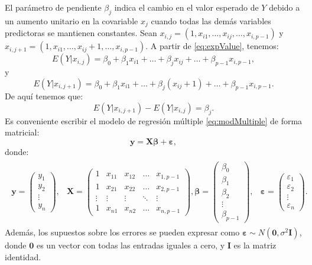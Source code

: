 \documentclass[
]{article}
\begin{document}
El parámetro de pendiente \(\beta_{j}\) indica el cambio en el valor esperado de \(Y\) debido a un aumento unitario en la covariable \(x_{j}\) cuando todas las demás variables predictoras se mantienen constantes. Sean \(x_{i,j} = (1,x_{i1},\ldots,x_{ij},\ldots,x_{i,p-1})\) y \(x_{i,j+1} = (1,x_{i1},\ldots,x_{ij}+1,\ldots,x_{i,p-1})\). A partir de \eqref{eq:expValue}, tenemos:
\[
E(Y|x_{i,j}) = \beta_{0} + \beta_{1}x_{i1} + \ldots + \beta_{j}x_{ij} + \ldots + \beta_{p-1} x_{i,p-1},
\]
y
\[
E(Y|x_{i,j+1}) = \beta_{0} + \beta_{1}x_{i1} + \ldots + \beta_{j}(x_{ij}+1) + \ldots + \beta_{p-1} x_{i,p-1}.
\]
De aquí tenemos que:
\[
E(Y|x_{i,j+1}) - E(Y|x_{i,j}) = \beta_{j}.
\]
Es conveniente escribir el modelo de regresión múltiple \eqref{eq:modMultiple} de forma matricial:
\[
\boldsymbol y= \boldsymbol X\boldsymbol \beta+ \boldsymbol \varepsilon,
\]
donde:
\begin{gather}
\begin{aligned}
\boldsymbol y= \begin{pmatrix}
y_{1} \\ y_{2} \\ \vdots \\ y_{n}
\end{pmatrix}, & \boldsymbol X= \begin{pmatrix}
1 & x_{11} & x_{12} & \ldots & x_{1,p-1} \\ 1 & x_{21} & x_{22} & \ldots & x_{2,p-1} \\ \vdots & \vdots & \vdots & \ddots & \vdots \\ 1 & x_{n1} & x_{n2} & \ldots & x_{n,p-1}
\end{pmatrix},
\boldsymbol \beta= \begin{pmatrix}
\beta_{0} \\ \beta_{1} \\ \beta_{2} \\ \vdots \\ \beta_{p-1}
\end{pmatrix}, & \boldsymbol \varepsilon= \begin{pmatrix}
\varepsilon_{1} \\ \varepsilon_{2} \\ \vdots \\ \varepsilon_{n}
\end{pmatrix}.
\end{aligned}
\nonumber
\end{gather}
Además, los supuestos sobre los errores se pueden expresar como \(\boldsymbol \varepsilon\sim N(\boldsymbol 0, \sigma^{2}\boldsymbol I)\), donde \(\boldsymbol 0\) es un vector con todas las entradas iguales a cero, y \(\boldsymbol I\) es la matriz identidad.
\end{document}
